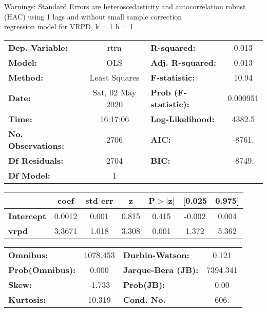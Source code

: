 Warnings: \newline
 [1] Standard Errors are heteroscedasticity and autocorrelation robust (HAC) using 1 lags and without small sample correction\\ 

regression model for VRPD, k = 1 h = 1\begin{center}
\begin{tabular}{lclc}
\toprule
\textbf{Dep. Variable:}    &       rtrn       & \textbf{  R-squared:         } &     0.013   \\
\textbf{Model:}            &       OLS        & \textbf{  Adj. R-squared:    } &     0.013   \\
\textbf{Method:}           &  Least Squares   & \textbf{  F-statistic:       } &     10.94   \\
\textbf{Date:}             & Sat, 02 May 2020 & \textbf{  Prob (F-statistic):} &  0.000951   \\
\textbf{Time:}             &     16:17:06     & \textbf{  Log-Likelihood:    } &    4382.5   \\
\textbf{No. Observations:} &        2706      & \textbf{  AIC:               } &    -8761.   \\
\textbf{Df Residuals:}     &        2704      & \textbf{  BIC:               } &    -8749.   \\
\textbf{Df Model:}         &           1      & \textbf{                     } &             \\
\bottomrule
\end{tabular}
\begin{tabular}{lcccccc}
                   & \textbf{coef} & \textbf{std err} & \textbf{z} & \textbf{P$> |$z$|$} & \textbf{[0.025} & \textbf{0.975]}  \\
\midrule
\textbf{Intercept} &       0.0012  &        0.001     &     0.815  &         0.415        &       -0.002    &        0.004     \\
\textbf{vrpd}      &       3.3671  &        1.018     &     3.308  &         0.001        &        1.372    &        5.362     \\
\bottomrule
\end{tabular}
\begin{tabular}{lclc}
\textbf{Omnibus:}       & 1078.453 & \textbf{  Durbin-Watson:     } &    0.121  \\
\textbf{Prob(Omnibus):} &   0.000  & \textbf{  Jarque-Bera (JB):  } & 7394.341  \\
\textbf{Skew:}          &  -1.733  & \textbf{  Prob(JB):          } &     0.00  \\
\textbf{Kurtosis:}      &  10.319  & \textbf{  Cond. No.          } &     606.  \\
\bottomrule
\end{tabular}
\end{center}

